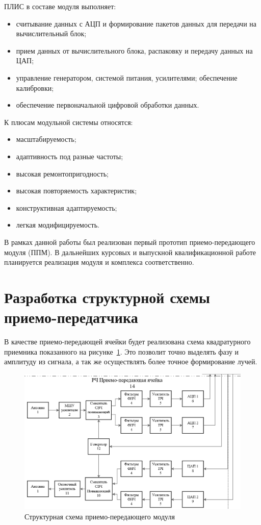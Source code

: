 \documentclass[utf8x, 14pt, oneside, a4paper]{article}
\begin{document}
	
	ПЛИС в составе модуля выполняет:
	\begin{itemize}
		\item считывание данных с АЦП и формирование пакетов данных для передачи на вычислительный блок;
		\item прием данных от вычислительного блока, распаковку и передачу данных на ЦАП;
		\item управление генератором, системой питания, усилителями;
		обеспечение калибровки;
		\item обеспечение первоначальной цифровой обработки данных.
	\end{itemize}

	К плюсам модульной системы относятся:
	\begin{itemize}
		\item масштабируемость;
		\item адаптивность под разные частоты;
		\item высокая ремонтопригодность;
		\item высокая повторяемость характеристик;
		\item конструктивная адаптируемость;
		\item легкая модифицируемость.
	\end{itemize}
	
	В рамках данной работы был реализован первый прототип приемо-передающего модуля (ППМ). В дальнейших курсовых и выпускной квалификационной работе планируется реализация модуля и комплекса соответственно.
	
	\pagebreak
	
	\section{Разработка структурной схемы приемо-передатчика}
		В качестве приемо-передающей ячейки будет реализована схема квадратурного приемника показанного на рисунке~\ref{fig:Структурная схема}. Это позволит точно выделять фазу и амплитуду из сигнала, а так же осуществлять более точное формирование лучей.
		\begin{figure}[h!]
			\centering
			\includegraphics[width=0.7\linewidth]{"Структурная схема"}
			\caption{Структурная схема приемо-передающего модуля}
			\label{fig:Структурная схема}
		\end{figure}
		
\end{document}
